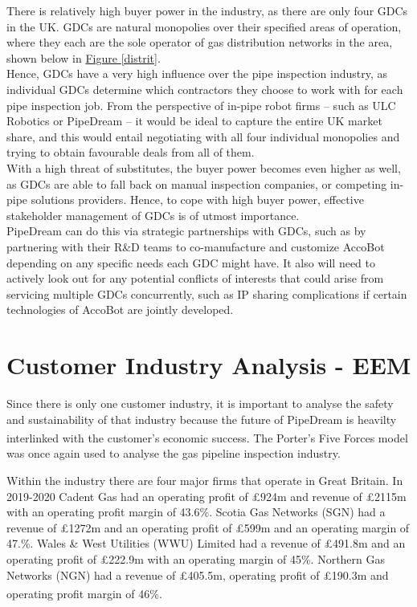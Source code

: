 \documentclass[11pt]{article}		%
\newcommand{\supercite}[1]{\textsuperscript{\cite{#1}}}		%
\newcommand{\figref}[1]{\hyperref[#1]{Figure \ref*{#1}}}    %
\begin{document}
    			There is relatively high buyer power in the industry, as there are only four GDCs in the UK. GDCs are natural monopolies over their specified areas of operation, where they each are the sole operator of gas distribution networks in the area, shown below in \figref{distrit}.
                \\\hspace*{3ex}Hence, GDCs have a very high influence over the pipe inspection industry, as individual GDCs determine which contractors they choose to work with for each pipe inspection job. From the perspective of in-pipe robot firms – such as ULC Robotics or PipeDream – it would be ideal to capture the entire UK market share, and this would entail negotiating with all four individual monopolies and trying to obtain favourable deals from all of them. 
                \\\hspace*{3ex}With a high threat of substitutes, the buyer power becomes even higher as well, as GDCs are able to fall back on manual inspection companies, or competing in-pipe solutions providers. Hence, to cope with high buyer power, effective stakeholder management of GDCs is of utmost importance.
                \\\hspace*{3ex}PipeDream can do this via strategic  partnerships with GDCs, such as by partnering with their R\&D teams to co-manufacture and customize AccoBot depending on any specific needs each GDC might have. It also will need to actively look out for any potential conflicts of interests that could arise from servicing multiple GDCs concurrently, such as IP sharing complications if certain technologies of AccoBot are jointly developed. 
				
	\section{Customer Industry Analysis - EEM}

		Since there is only one customer industry, it is important to analyse the safety and sustainability of that industry because the future of PipeDream is heavilty interlinked with the customer's economic success.
		The Porter's Five Forces model\supercite{porter2008five} was once again used to analyse the gas pipeline inspection industry.
		
		Within the industry there are four major firms that operate in Great Britain. In 2019-2020 Cadent Gas had an operating profit of £924m and revenue of £2115m with an operating profit margin of 43.6\%. Scotia Gas Networks (SGN) had a revenue of £1272m and an operating profit of £599m and an operating margin of 47.\%. Wales \& West Utilities (WWU) Limited had a revenue of £491.8m and an operating profit of £222.9m with an operating margin of 45\%. Northern Gas Networks (NGN) had a revenue of £405.5m, operating profit of £190.3m and operating profit margin of 46\%.  \supercite{Gas_Distribution_Industry}
			
\end{document}
